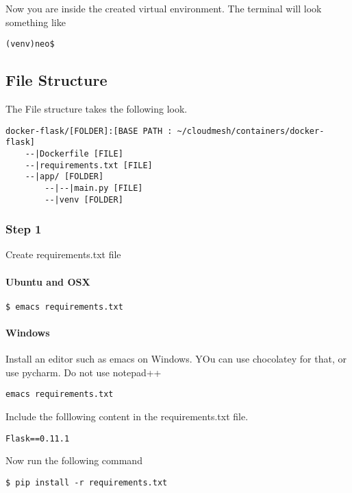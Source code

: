 Now you are inside the created virtual environment. The terminal will
look something like

\begin{lstlisting}
(venv)neo$
\end{lstlisting}

\subsection{File Structure}

The File structure takes the following look.

\begin{lstlisting}
docker-flask/[FOLDER]:[BASE PATH : ~/cloudmesh/containers/docker-flask]
    --|Dockerfile [FILE]
    --|requirements.txt [FILE]
    --|app/ [FOLDER]
        --|--|main.py [FILE]
        --|venv [FOLDER]
\end{lstlisting}

\subsubsection{Step 1}

Create requirements.txt file

\paragraph{Ubuntu and OSX}

\begin{lstlisting}
$ emacs requirements.txt
\end{lstlisting}

\paragraph{Windows}

Install an editor such as emacs on Windows. YOu can use chocolatey for
that, or use pycharm. Do not use notepad++

\begin{lstlisting}
emacs requirements.txt
\end{lstlisting}

Include the folllowing content in the requirements.txt file.

\begin{lstlisting}
Flask==0.11.1
\end{lstlisting}

Now run the following command

\begin{lstlisting}
$ pip install -r requirements.txt
\end{lstlisting}

